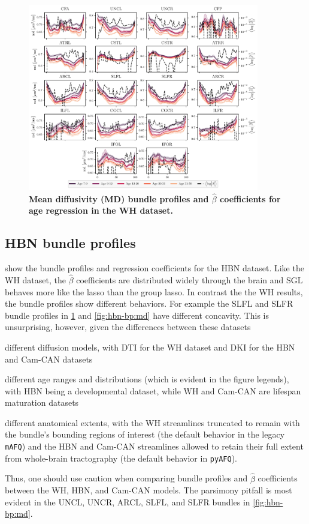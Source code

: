 \documentclass[10pt,letterpaper]{article}
\begin{document}
\begin{figure}
    \includegraphics[width=0.9\textwidth]{wh_coefs_profiles_md.pdf}
    \caption{%
        {%
            \bf Mean diffusivity (MD) bundle profiles and $\hat{\beta}$
            coefficients for age regression in the WH dataset.
        }
        \label{fig:wh-bp:md}
    }
\end{figure}

\subsection{HBN bundle profiles}

 show the bundle profiles and regression
coefficients for the HBN dataset. Like the WH dataset, the $\hat{\beta}$
coefficients are distributed widely through the brain and SGL behaves more
like the lasso than the group lasso. In contrast the the WH results,
the bundle profiles show different behaviors. For example the SLFL and SLFR
bundle profiles in \cref{fig:wh-bp:md} and \cref{fig:hbn-bp:md} have
different concavity. This is unsurprising, however, given the differences
between these datasets
\begin{enumerate*}[%
    label=(\roman*),%
    before=\unskip{: },%
    itemjoin={{, }},%
    itemjoin*={{, and }}]
    \item different diffusion models, with DTI for the WH dataset and DKI for
    the HBN and Cam-CAN datasets
    \item different age ranges and distributions (which is evident in the
    figure legends), with HBN being a developmental dataset, while WH and Cam-CAN are
    lifespan maturation datasets
    \item different anatomical extents, with the WH streamlines truncated to
    remain with the bundle's bounding regions of interest (the default
    behavior in the legacy \texttt{mAFQ}) and the HBN and Cam-CAN streamlines
    allowed to retain their full extent from whole-brain tractography (the
    default behavior in \texttt{pyAFQ}).
\end{enumerate*}
Thus, one should use caution when comparing bundle profiles and $\hat{\beta}$
coefficients between the WH, HBN, and Cam-CAN models.
The parsimony pitfall is most evident in the UNCL, UNCR, ARCL, SLFL, and
SLFR bundles in \cref{fig:hbn-bp:md}.
\end{document}
